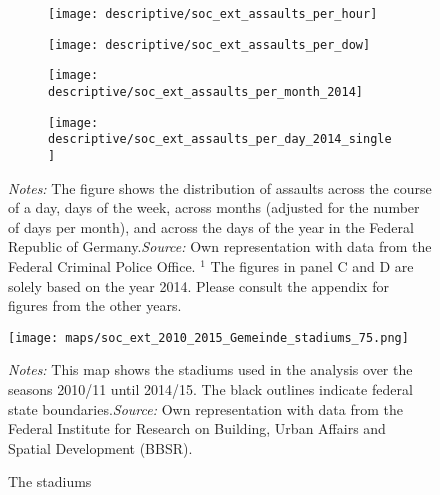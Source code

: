 \documentclass[11pt, a4paper]{article} %
\begin{document}
\vspace*{\fill}
\begin{figure}[H]\centering
	\caption{Distribution of assaults across time}\label{fig_soc_ext:assault_time_distribution_2014}
	\begin{subfigure}[h]{0.48\linewidth}\centering
		\texttt{[image: descriptive/soc\_ext\_assaults\_per\_hour]}
	\end{subfigure}
	\begin{subfigure}[h]{0.48\linewidth}\centering
		\texttt{[image: descriptive/soc\_ext\_assaults\_per\_dow]}
	\end{subfigure}

	\begin{subfigure}[h]{0.48\linewidth}\centering
		\texttt{[image: descriptive/soc\_ext\_assaults\_per\_month\_2014]}
	\end{subfigure}
	\begin{subfigure}[h]{0.48\linewidth}\centering
		\texttt{[image: descriptive/soc\_ext\_assaults\_per\_day\_2014\_single]}
	\end{subfigure}
	\begin{minipage}{\linewidth}
		\scriptsize{\emph{Notes:} The figure shows the distribution of assaults across the course of a day, days of the week, across months (adjusted for the number of days per month), and across the days of the year in the Federal Republic of Germany.\newline \emph{Source:} Own representation with data from the Federal Criminal Police Office.\newline \hspace{1 em} $^1$ The figures in panel C and D are solely based on the year 2014. Please consult the appendix for figures from the other years.}
	\end{minipage}
\end{figure}
\vspace*{\fill}\clearpage



\vspace*{\fill}
\begin{figure}[H]\centering
	\caption{The stadiums}\label{fig_soc_ext:map_gem_stadiums}
	\texttt{[image: maps/soc\_ext\_2010\_2015\_Gemeinde\_stadiums\_75.png]}
	\begin{minipage}{0.95\linewidth}
		\scriptsize{\emph{Notes:} This map shows the stadiums used in the analysis over the seasons 2010/11 until 2014/15. The black outlines indicate federal state boundaries.\newline \emph{Source:} Own representation with data from the Federal Institute for Research on Building, Urban Affairs and Spatial Development (BBSR).}
	\end{minipage}
\end{figure}
\vspace*{\fill}\clearpage
\end{document}
